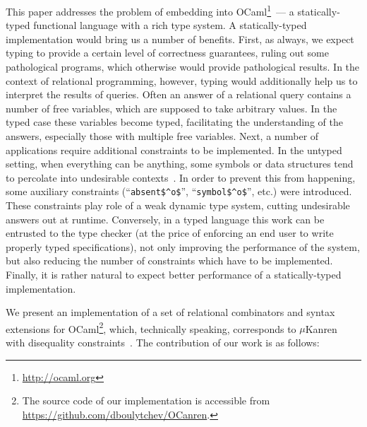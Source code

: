 This paper addresses the problem of embedding \miniKanren into OCaml\footnote{\url{http://ocaml.org}}~--- a statically-typed functional language with 
a rich type system. A statically-typed implementation would bring us a number of benefits. First, as always, 
we expect typing to provide a certain level of correctness guarantees, ruling out some pathological programs, which
otherwise would provide pathological results. In the context of relational programming, however, typing would additionally 
help us to interpret the results of queries. Often an answer of a relational query contains a number of
free variables, which are supposed to take arbitrary values. In the typed case these variables become typed,
facilitating the understanding of the answers, especially those with multiple free variables. Next, a number of \miniKanren 
applications require additional constraints to be implemented. In the untyped setting, when everything can be anything, 
some symbols or data structures tend to percolate into undesirable contexts~\cite{Untagged}. In order to prevent this from happening, some 
auxiliary constraints (``\lstinline{absent$^o$}'', ``\lstinline{symbol$^o$}'', etc.) were introduced. These constraints play role of 
a weak dynamic type system, cutting undesirable answers out at runtime. Conversely, in a typed language this work can be
entrusted to the type checker (at the price of enforcing an end user to write properly typed specifications), not only improving the
performance of the system, but also reducing the number of constraints which have to be implemented. Finally, it is rather natural
to expect better performance of a statically-typed implementation.

We present an implementation of a set of relational combinators and syntax extensions for 
OCaml\footnote{The source code of our implementation is accessible from \url{https://github.com/dboulytchev/OCanren}.}, 
which, technically speaking, corresponds to $\mu$Kanren~\cite{MicroKanren} with disequality 
constraints~\cite{CKanren}. The contribution of our work is as follows:

